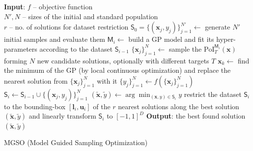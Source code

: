 \documentclass{itatnew}
\newcommand{\xx}{\mathrm{\mathbf{x}}}
\begin{document}
\begin{algorithm}[t]
\begin{algorithmic}[1]
{\small
  \STATE \textbf{Input}: $f$ -- objective function \\
      \quad $N', N$ -- sizes of the initial and standard population \\
      \quad $r$ -- no. of solutions for dataset restriction
  \STATE $\mathsf{S}_0 = \{(\xx_j, y_j)\}_{j=1}^{N'} \leftarrow$ generate $N'$ initial samples 
      and evaluate them %
    \STATE $\mathsf{M}_i \leftarrow$ build a GP model and fit its hyper-parameters
        according to the dataset $\mathsf{S}_{i-1}$
    \STATE $\{\xx_j\}_{j=1}^{N}  \leftarrow$ sample the $\textrm{PoI}_T^{\mathsf{M}_i}(\xx)$ 
        forming $N$ new candidate solutions, optionally with different targets $T$
    \STATE $\xx_k \leftarrow$ find the minimum of the GP (by local continuous optimization) and replace the nearest solution from $\{\xx_j\}_{j=1}^{N}$ with it
    \STATE $\{y_j\}_{j=1}^N \leftarrow f(\{\xx_j\}_{j=1}^N)$  \hspace{\fill}   
    \STATE $\mathsf{S}_i \leftarrow \mathsf{S}_{i-1} \cup \{(\xx_j, y_j)\}_{j=1}^N$  \hspace{\fill}   
    \STATE $(\tilde{\xx}, \tilde{y}) \leftarrow \arg \min_{(\xx,y) \in \mathsf{S}_i} y$  \hspace{\fill}  
    \STATE restrict the dataset $\mathsf{S}_i$ to the bounding-box $[\mathbf{l}_i,\mathbf{u}_i]$ of the $r$ nearest solutions along the best solution $(\tilde{\xx},\tilde{y})$ and linearly transform $\mathsf{S}_i$ to $[-1, 1]^D$
    \ENDIF
  \ENDWHILE
  \STATE \textbf{Output}: the best found solution $(\tilde{\xx}, \tilde{y})$
}
\end{algorithmic}
\caption{MGSO (Model Guided Sampling Optimization)}
\label{alg:mgso}
\end{algorithm}
\end{document}
